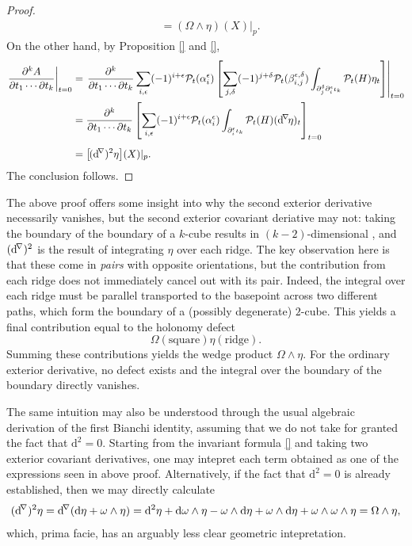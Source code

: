 \begin{proof}
\begin{align}
  &= (\Omega \wedge \eta) (X)|_p.
\end{align}
On the other hand, by Proposition \ref{} and \ref{}, 
\begin{align}
  \left.\frac{\partial^k A}{\partial t_1 \cdots \partial t_k}\right|_{t = 0} &= \left.\frac{\partial^k}{\partial t_1 \cdots \partial t_k}\sum_{i, \epsilon} (-1)^{i+\epsilon} \mathcal{P}_t(\alpha_i^\epsilon) \left[\sum_{j, \delta} (-1)^{j+\delta}\mathcal{P}_t(\beta_{i, j}^{\epsilon, \delta}) \int_{\partial_j^\delta \partial_i^\epsilon \iota_k} \mathcal{P}_t(H) \eta_t \right]\right|_{t = 0} \nonumber \\
  &= \frac{\partial^k}{\partial t_1 \cdots \partial t_k}\left[\sum_{i, \epsilon} (-1)^{i+\epsilon} \mathcal{P}_t(\alpha_i^\epsilon) \int_{ \partial_i^\epsilon \iota_k} \mathcal{P}_t(H) (\mathrm{d}^{\! \nabla \!} \eta)_t \right]_{t = 0} \nonumber \\[1ex]
  &= \big[\mskip -2mu (\mathrm{d}^{\mskip -3mu \nabla})^2  \eta\big] (X)|_p.
\end{align}
The conclusion follows.
\end{proof}

The above proof offers some insight into why the second exterior derivative necessarily vanishes, but the second exterior covariant deriative may not: taking the boundary of the boundary of a $k$-cube results in $(k-2)$-dimensional , and $(\mathrm{d}^{\mskip -3mu \nabla})^2$ is the result of integrating $\eta$ over each ridge. The key observation here is that these come in \emph{pairs} with opposite orientations, but the contribution from each ridge does not immediately cancel out with its pair. Indeed, the integral over each ridge must be parallel transported to the basepoint across two different paths, which form the boundary of a (possibly degenerate) $2$-cube. This yields a final contribution equal to the holonomy defect
\begin{equation}
  \Omega(\text{square}) \eta(\text{ridge}).
\end{equation}
Summing these contributions yields the wedge product $\Omega \wedge \eta$. For the ordinary exterior derivative, no defect exists and the integral over the boundary of the boundary directly vanishes. 

The same intuition may also be understood through the usual algebraic derivation of the first Bianchi identity, assuming that we do not take for granted the fact that $\mathrm{d}^2 = 0$. Starting from the invariant formula \eqref{} and taking two exterior covariant derivatives, one may intepret each term obtained as one of the expressions seen in above proof. Alternatively, if the fact that $\mathrm{d}^2 = 0$ is already established, then we may directly calculate
\begin{equation}
  (\mathrm{d}^{\mskip -3mu \nabla})^2 \eta = \mathrm{d}^{\mskip -3mu \nabla} (\mathrm{d}\eta + \omega \wedge \eta) = \mathrm{d}^2 \eta + \mathrm{d} \omega \wedge \eta - \omega \wedge \mathrm{d}\eta + \omega \wedge \mathrm{d}\eta +\omega \wedge \omega \wedge \eta = \Omega \wedge \eta,
\end{equation}
which, prima facie, has an arguably less clear geometric intepretation. 

